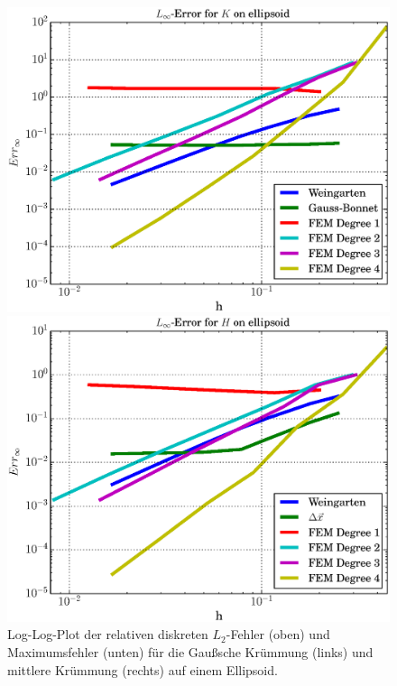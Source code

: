 \begin{figure}
\begin{minipage}[t]{0.49\textwidth}
    \end{minipage}\\
    \begin{minipage}[t]{0.49\textwidth}
       \centering\includegraphics[width=\textwidth]{bilder/Curvature/heineC/ErrKMax.eps}
    \end{minipage}\hfill
    \begin{minipage}[t]{0.49\textwidth}
       \centering\includegraphics[width=\textwidth]{bilder/Curvature/heineC/ErrHMax.eps}
    \end{minipage}
    \caption[Fehlerplot (Krümmungen auf Ellipsoid)]
            {Log-Log-Plot der relativen diskreten \( L_{2} \)-Fehler (oben) und Maximumsfehler (unten) 
             für die Gaußsche Krümmung (links) und mittlere Krümmung (rechts) auf einem Ellipsoid.}
    \label{figErrCompHeineC}
  \end{figure}
